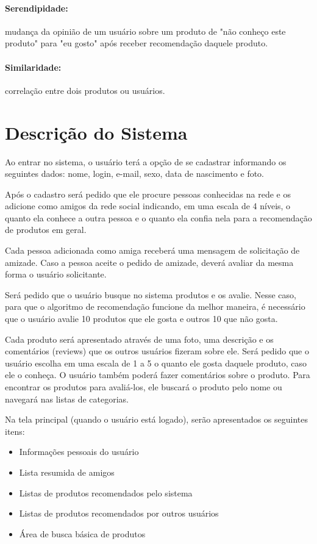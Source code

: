\documentclass[a4paper,12pt]{article}
\begin{document}
\paragraph{Serendipidade:} mudança da opinião de um usuário sobre um produto de "não conheço este produto" para "eu gosto" após receber recomendação daquele produto.

\paragraph{Similaridade:} correlação entre dois produtos ou usuários.

\section{Descrição do Sistema}
\label{descricao}

Ao entrar no sistema, o usuário terá a opção de se cadastrar informando os seguintes dados: nome, login, e-mail, sexo, data de nascimento e foto.

Após o cadastro será  pedido que ele procure pessoas conhecidas na rede e os adicione como amigos da rede social indicando, em uma escala de 4 níveis, o quanto ela conhece a outra pessoa e o quanto ela confia nela para a recomendação de produtos em geral.

Cada pessoa adicionada como amiga receberá uma mensagem de solicitação de amizade. Caso a pessoa aceite o pedido de amizade, deverá avaliar da mesma forma o usuário solicitante.

Será pedido que o usuário busque no sistema produtos e os avalie. Nesse caso, para que o algoritmo de recomendação funcione da melhor maneira, é necessário que o usuário avalie 10 produtos que ele gosta e outros 10 que não gosta.

Cada produto será  apresentado através de uma foto, uma descrição e os comentários (reviews) que os outros usuários fizeram sobre ele. Será pedido que o usuário escolha em uma escala de 1 a 5 o quanto ele gosta daquele produto, caso ele o conheça. O usuário também poderá fazer comentários sobre o produto. Para encontrar os produtos para avaliá-los, ele buscará o produto pelo nome ou navegará nas listas de categorias.

Na tela principal (quando o usuário está logado), serão apresentados os seguintes itens:

\begin{itemize}
    \item Informações pessoais do usuário
    \item Lista resumida de amigos
    \item Listas de produtos recomendados pelo sistema
    \item Listas de produtos recomendados por outros usuários
    \item Área de busca básica de produtos
\end{itemize}
\end{document}
